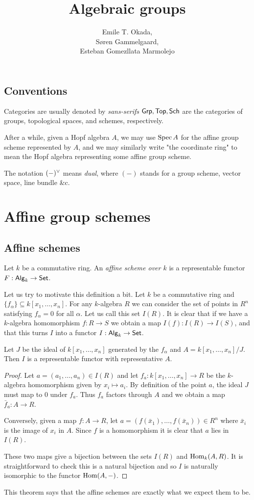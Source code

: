\documentclass{memoir}
\title{Algebraic groups}
\author{Emile T. Okada,\\ S\o ren Gammelgaard,\\ Esteban Gomezllata Marmolejo}
\begin{document}
\maketitle
\tableofcontents
\section{Conventions}
Categories are usually denoted by \emph{sans-serifs} \ie $ {\normalfont\mathsf{Grp}}, {\normalfont\mathsf{Top}}, {\normalfont\mathsf{Sch}} $ are the categories of groups, topological spaces, and schemes, respectively. 

After a while, given a Hopf algebra $ A $, we may use $ \operatorname{Spec} A $ for the affine group scheme represented by $ A $, and we may similarly write "the coordinate ring" to mean the Hopf algebra representing some affine group scheme. 

The notation $ (-){}^\vee $ means \emph{dual}, where $ (-) $ stands for a group scheme, vector space, line bundle \&c.
\chapter{Affine group schemes}
\section{Affine schemes}
\begin{definition}
    Let $k$ be a commutative ring. An \textit{affine scheme over $k$} is a representable functor $F:{\normalfont\mathsf{Alg}}_k\to {\normalfont\mathsf{Set}}$.
\end{definition}
Let us try to motivate this definition a bit. 
Let $k$ be a commutative ring and $\{f_\alpha\}\subseteq k[x_1,\dots,x_n]$.
For any $k$-algebra $R$ we can consider the set of points in $R^n$ satisfying $f_\alpha = 0$ for all $\alpha$.
Let us call this set $I(R)$.
It is clear that if we have a $k$-algebra homomorphism $f:R\to S$ we obtain a map $I(f):I(R) \to I(S)$, and that this turns $I$ into a functor $I:{\normalfont\mathsf{Alg}}_k\to {\normalfont\mathsf{Set}}$.
\begin{theorem}
    Let $J$ be the ideal of $k[x_1,\dots,x_n]$ generated by the $f_\alpha$ and $A = k[x_1,\dots,x_n]/J$.
    Then $I$ is a representable functor with representative $A$.
\end{theorem}
\begin{proof}
    Let $a = (a_1,\dots,a_n)\in I(R)$ and let $f_a:k[x_1,\dots,x_n]\to R$ be the $k$-algebra homomorphism given by $x_i\mapsto a_i$.
    By definition of the point $a$, the ideal $J$ must map to 0 under $f_a$.
    Thus $f_a$ factors through $A$ and we obtain a map $\bar f_a: A\to R$.

    Conversely, given a map $f:A\to R$, let $a = (f(\bar x_1),\dots,f(\bar x_n))\in R^n$ where $\bar x_i$ is the image of $x_i$ in $A$.
    Since $f$ is a homomorphism it is clear that $a$ lies in $I(R)$.

    These two maps give a bijection between the sets $I(R)$ and $\operatorname{Hom}_k(A,R)$.
    It is straightforward to check this is a natural bijection and so $I$ is naturally isomorphic to the functor $\operatorname{Hom}(A,-)$.
\end{proof}
This theorem says that the affine schemes are exactly what we expect them to be.
\end{document}
